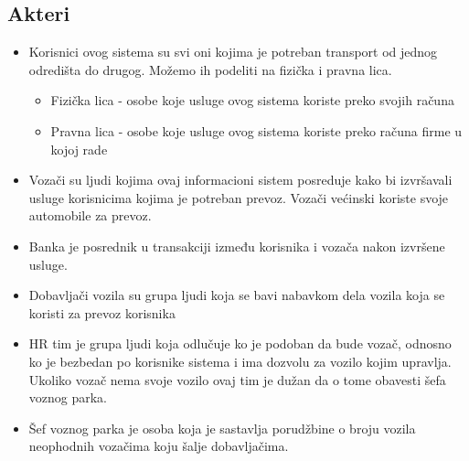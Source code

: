 \subsection{\bfseries Akteri}
\begin{itemize}
    \item Korisnici ovog sistema su svi oni kojima je potreban transport od jednog odredišta do drugog. Možemo ih podeliti na fizička i pravna lica. 
    \begin{itemize}
        \item Fizička lica - osobe koje usluge ovog sistema koriste preko svojih računa
        \item Pravna lica - osobe koje usluge ovog sistema koriste preko računa firme u kojoj rade
    \end{itemize}
    \item Vozači su ljudi kojima ovaj informacioni sistem posreduje kako bi izvršavali usluge korisnicima kojima je potreban prevoz. Vozači većinski koriste svoje automobile za prevoz.
    \item Banka je posrednik u transakciji između korisnika i vozača nakon izvršene usluge.
    \item Dobavljači vozila su grupa ljudi koja se bavi nabavkom dela vozila koja se koristi za prevoz korisnika
    \item HR tim je grupa ljudi koja odlučuje ko je podoban da bude vozač, odnosno ko je bezbedan po korisnike sistema i ima dozvolu za vozilo kojim upravlja. Ukoliko vozač nema svoje vozilo ovaj tim je dužan da o tome obavesti šefa voznog parka.
     \item Šef voznog parka je osoba koja je sastavlja porudžbine o broju vozila neophodnih vozačima koju šalje dobavljačima.
\end{itemize}